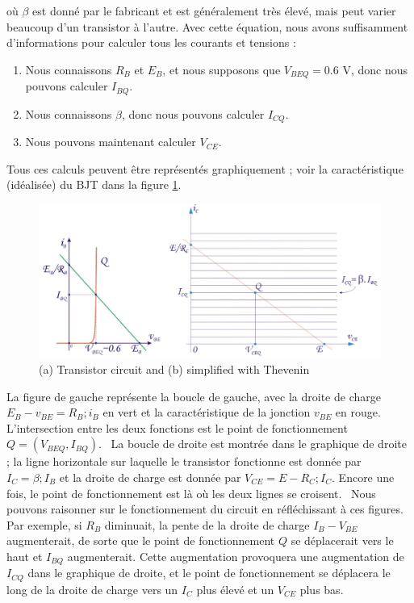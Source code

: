 où $\beta$ est donné par le fabricant et est généralement très élevé, mais peut varier beaucoup d'un transistor à l'autre. Avec cette équation, nous avons suffisamment d'informations pour calculer tous les courants et tensions :
\begin{enumerate}
	\item Nous connaissons $R_B$ et $E_B$, et nous supposons que $V_{BEQ} = 0.6$ V, donc nous pouvons calculer $I_{BQ}$.
	\item Nous connaissons $\beta$, donc nous pouvons calculer $I_{CQ}$.
	\item Nous pouvons maintenant calculer $V_{CE}$.
\end{enumerate}
Tous ces calculs peuvent être représentés graphiquement ; voir la caractéristique (idéalisée) du BJT dans la figure \ref{fig:bjt_load2}.
\begin{figure}[h!]
	\centering
	\includegraphics[width=12cm]{figures/ch02/bjt_load2.jpg}
	\caption{(a) Transistor circuit and (b) simplified with Thevenin} 
	\label{fig:bjt_load2}
\end{figure}
La figure de gauche représente la boucle de gauche, avec la droite de charge $E_B - v_{BE} = R_B ; i_B$ en vert et la caractéristique de la jonction $v_{BE}$ en rouge. L'intersection entre les deux fonctions est le point de fonctionnement $Q = (V_{BEQ}, I_{BQ})$. \
La boucle de droite est montrée dans le graphique de droite ; la ligne horizontale sur laquelle le transistor fonctionne est donnée par $I_{C} = \beta ; I_{B}$ et la droite de charge est donnée par $V_{CE} = E - R_C ; I_{C}$. Encore une fois, le point de fonctionnement est là où les deux lignes se croisent. \
Nous pouvons raisonner sur le fonctionnement du circuit en réfléchissant à ces figures. Par exemple, si $R_B$ diminuait, la pente de la droite de charge $I_B - V_{BE}$ augmenterait, de sorte que le point de fonctionnement $Q$ se déplacerait vers le haut et $I_{BQ}$ augmenterait. Cette augmentation provoquera une augmentation de $I_{CQ}$ dans le graphique de droite, et le point de fonctionnement se déplacera le long de la droite de charge vers un $I_C$ plus élevé et un $V_{CE}$ plus bas. \
